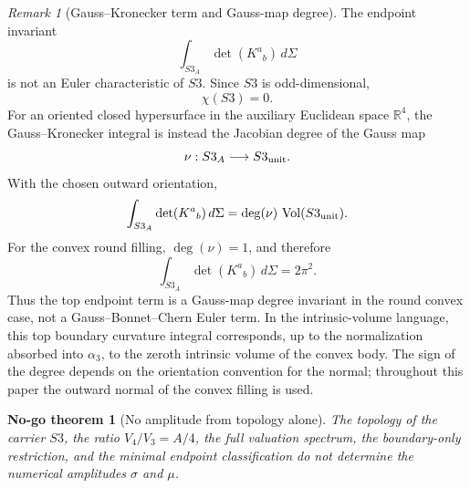 \documentclass[11pt,a4paper]{article}
\def\Sthree{S3}%
\def\dd{d}%
\numberwithin{equation}{section}
\newtheorem{nogotheorem}[criterion]{No-go theorem}
\theoremstyle{remark}
\newtheorem{remark}[criterion]{Remark}
\newcommand{\Sthree}{S^3}
\newcommand{\vol}{\operatorname{Vol}}
\newcommand{\dd}{\mathrm{d}}
\begin{document}
\begin{remark}[Gauss--Kronecker term and Gauss-map degree]
The endpoint invariant
\begin{equation}
\int_{\Sthree_A}\det(K^a{}_b)\,\dd\Sigma
\end{equation}
is not an Euler characteristic of \(\Sthree\). Since \(\Sthree\) is odd-dimensional,
\begin{equation}
\chi(\Sthree)=0.
\end{equation}
For an oriented closed hypersurface in the auxiliary Euclidean space \(\mathbb{R}^4\), the Gauss--Kronecker integral is instead the Jacobian degree of the Gauss map
\begin{equation}
\nu:\Sthree_A\longrightarrow \Sthree_{\rm unit}.
\end{equation}
With the chosen outward orientation,
\begin{equation}
\int_{\Sthree_A}\det(K^a{}_b)\,\dd\Sigma
=\deg(\nu)\,\vol(\Sthree_{\rm unit}).
\end{equation}
For the convex round filling, \(\deg(\nu)=1\), and therefore
\begin{equation}
\int_{\Sthree_A}\det(K^a{}_b)\,\dd\Sigma=2\pi^2.
\end{equation}
Thus the top endpoint term is a Gauss-map degree invariant in the round convex case, not a Gauss--Bonnet--Chern Euler term. In the intrinsic-volume language, this top boundary curvature integral corresponds, up to the normalization absorbed into \(\alpha_3\), to the zeroth intrinsic volume of the convex body. The sign of the degree depends on the orientation convention for the normal; throughout this paper the outward normal of the convex filling is used.
\end{remark}

\begin{nogotheorem}[No amplitude from topology alone]
The topology of the carrier \(\Sthree\), the ratio \(V_4/V_3=A/4\), the full valuation spectrum, the boundary-only restriction, and the minimal endpoint classification do not determine the numerical amplitudes \(\sigma\) and \(\mu\).
\end{nogotheorem}
\end{document}
